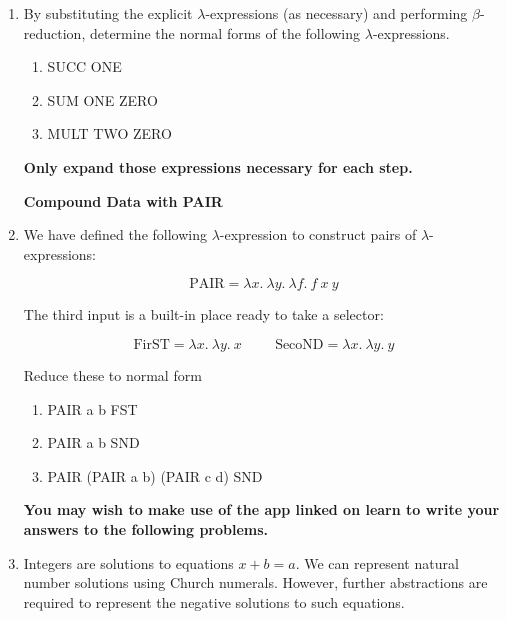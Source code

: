 \documentclass[11pt]{report}
\begin{document}
\begin{enumerate}
	\item By substituting the explicit $\lambda$-expressions (as necessary) and performing $\beta$-reduction, determine the normal forms of the following $\lambda$-expressions. 

	\begin{enumerate}
		\item SUCC ONE \vspace{0.2cm}
		\item SUM ONE ZERO \vspace{0.2cm}
		\item MULT TWO ZERO %
	\end{enumerate}

	{\bf Only expand those expressions necessary for each step.}
	
	\newpage
	\begin{center}
		{\bf Compound Data with PAIR}
	\end{center}

	\item We have defined the following $\lambda$-expression to construct pairs of $\lambda$-expressions:
	
	$$\text{PAIR} = \lambda x. \ \lambda y. \ \lambda f. \ f \ x \ y$$

	The third input is a built-in place ready to take a selector:

	$$\text{FirST} = \lambda x. \ \lambda y. \ x \hspace{1cm} \text{SecoND} = \lambda x. \ \lambda y. \ y$$

	 Reduce these to normal form 

		\begin{enumerate}
			\item PAIR a b FST \vspace{0.2cm}
			\item PAIR a b SND \vspace{0.2cm}
			\item PAIR (PAIR a b) (PAIR c d) SND
		\end{enumerate}

	{\bf You may wish to make use of the app linked on learn to write your answers to the following problems.}

	\item Integers are solutions to equations $x + b = a$. We can represent natural number solutions using Church numerals. However, further abstractions are required to represent the negative solutions to such equations. 


\end{enumerate}
\end{document}
